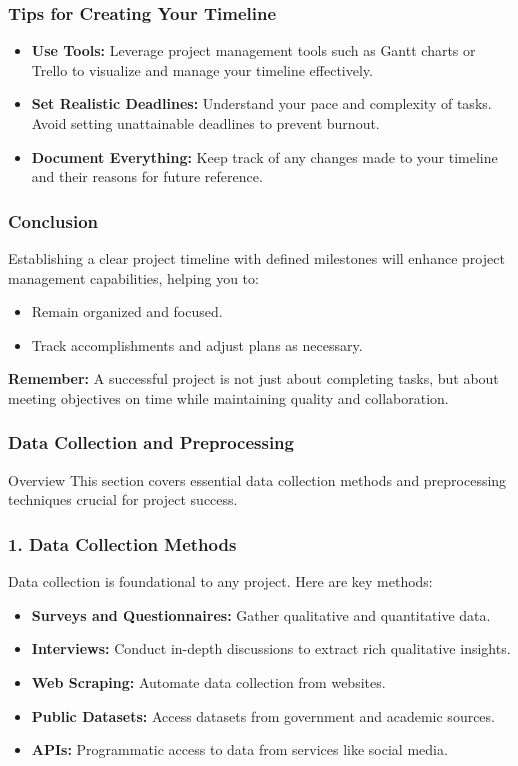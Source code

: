 \documentclass[aspectratio=169]{beamer}
\begin{document}
\begin{frame}[fragile]
    \frametitle{Tips for Creating Your Timeline}
    \begin{itemize}
        \item \textbf{Use Tools:} Leverage project management tools such as Gantt charts or Trello to visualize and manage your timeline effectively.
        \item \textbf{Set Realistic Deadlines:} Understand your pace and complexity of tasks. Avoid setting unattainable deadlines to prevent burnout.
        \item \textbf{Document Everything:} Keep track of any changes made to your timeline and their reasons for future reference.
    \end{itemize}
\end{frame}

\begin{frame}[fragile]
    \frametitle{Conclusion}
    Establishing a clear project timeline with defined milestones will enhance project management capabilities, helping you to:
    \begin{itemize}
        \item Remain organized and focused.
        \item Track accomplishments and adjust plans as necessary.
    \end{itemize}
    \textbf{Remember:} A successful project is not just about completing tasks, but about meeting objectives on time while maintaining quality and collaboration.
\end{frame}

\begin{frame}[fragile]
    \frametitle{Data Collection and Preprocessing}
    \begin{block}{Overview}
        This section covers essential data collection methods and preprocessing techniques crucial for project success.
    \end{block}
\end{frame}

\begin{frame}[fragile]
    \frametitle{1. Data Collection Methods}
    Data collection is foundational to any project. Here are key methods:
    \begin{itemize}
        \item \textbf{Surveys and Questionnaires:} Gather qualitative and quantitative data.
        \item \textbf{Interviews:} Conduct in-depth discussions to extract rich qualitative insights.
        \item \textbf{Web Scraping:} Automate data collection from websites.
        \item \textbf{Public Datasets:} Access datasets from government and academic sources.
        \item \textbf{APIs:} Programmatic access to data from services like social media.
    \end{itemize}
\end{frame}
\end{document}
